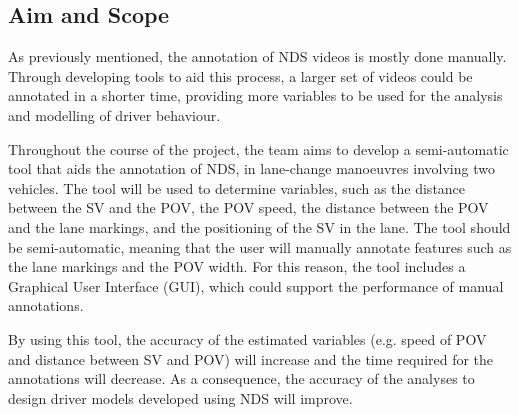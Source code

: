 \subsection{Aim and Scope}

As previously mentioned, the annotation of NDS videos is mostly done manually. Through developing tools to aid this process, a larger set of videos could be annotated in a shorter time, providing more variables to be used for the analysis and modelling of driver behaviour.

Throughout the course of the project, the team aims to develop a semi-automatic tool that aids the annotation of NDS, in lane-change manoeuvres involving two vehicles. The tool will be used to determine variables, such as the distance between the SV and the POV, the POV speed, the distance between the POV and the lane markings, and the positioning of the SV in the lane. The tool should be semi-automatic, meaning that the user will manually annotate features such as the lane markings and the POV width. For this reason, the tool includes a Graphical User Interface (GUI), which could support the performance of manual annotations. 

By using this tool, the accuracy of the estimated variables (e.g. speed of POV and distance between SV and POV) will increase and the time required for the annotations will decrease. As a consequence, the accuracy of the analyses to design driver models developed using NDS will improve.